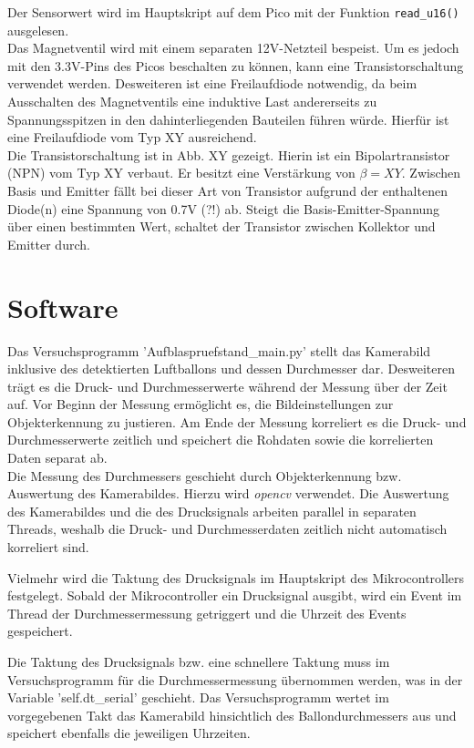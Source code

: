\documentclass[german, 11pt]{scrartcl}
\begin{document}
Der Sensorwert wird im Hauptskript auf dem Pico mit der Funktion \texttt{read\_u16()} ausgelesen.\\

Das Magnetventil wird mit einem separaten 12V-Netzteil bespeist. Um es jedoch mit den 3.3V-Pins des Picos beschalten zu können,
kann eine Transistorschaltung verwendet werden. Desweiteren ist eine Freilaufdiode notwendig, da beim Ausschalten des Magnetventils
eine induktive Last andererseits zu Spannungsspitzen in den dahinterliegenden Bauteilen führen würde.
Hierfür ist eine Freilaufdiode vom Typ XY ausreichend.\\

Die Transistorschaltung ist in Abb. XY gezeigt. Hierin ist ein Bipolartransistor (NPN) vom Typ XY verbaut.
Er besitzt eine Verstärkung von $\beta = XY$.
Zwischen Basis und Emitter fällt bei dieser Art von Transistor aufgrund der enthaltenen Diode(n) eine Spannung von 0.7V (?!) ab.
Steigt die Basis-Emitter-Spannung über einen bestimmten Wert, schaltet der Transistor zwischen Kollektor und Emitter durch.

\section{Software}
Das Versuchsprogramm 'Aufblaspruefstand\_main.py' stellt das Kamerabild inklusive des detektierten Luftballons
und dessen Durchmesser dar. Desweiteren trägt es die Druck- und Durchmesserwerte während der Messung über der Zeit auf.
Vor Beginn der Messung ermöglicht es, die Bildeinstellungen zur Objekterkennung zu justieren.
Am Ende der Messung korreliert es die Druck- und Durchmesserwerte zeitlich und speichert die Rohdaten sowie die korrelierten Daten separat ab.\\

Die Messung des Durchmessers geschieht durch Objekterkennung bzw. Auswertung des Kamerabildes. Hierzu wird \textit{opencv} verwendet.
Die Auswertung des Kamerabildes und die des Drucksignals arbeiten parallel in separaten Threads,
weshalb die Druck- und Durchmesserdaten zeitlich nicht automatisch korreliert sind.

Vielmehr wird die Taktung des Drucksignals im Hauptskript des Mikrocontrollers festgelegt.
Sobald der Mikrocontroller ein Drucksignal ausgibt, wird ein Event im Thread der Durchmessermessung getriggert
und die Uhrzeit des Events gespeichert.

Die Taktung des Drucksignals bzw. eine schnellere Taktung muss im Versuchsprogramm für die Durchmessermessung übernommen werden,
was in der Variable 'self.dt\_serial' geschieht. Das Versuchsprogramm wertet im vorgegebenen Takt das Kamerabild
hinsichtlich des Ballondurchmessers aus und speichert ebenfalls die jeweiligen Uhrzeiten.
\end{document}
